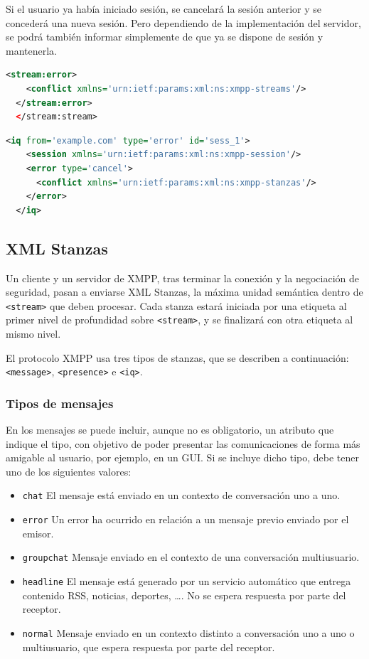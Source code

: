 \documentclass[a4paper, 11pt]{article} %
\begin{document}
      Si el usuario ya había iniciado sesión, se cancelará la sesión anterior y se concederá
      una nueva sesión. Pero dependiendo de la implementación del servidor, se podrá también informar
      simplemente de que ya se dispone de sesión y mantenerla.
      
  \begin{lstlisting}[language=XML]
  <stream:error>
    <conflict xmlns='urn:ietf:params:xml:ns:xmpp-streams'/>
  </stream:error>
  </stream:stream>
  \end{lstlisting}
  \begin{lstlisting}[language=XML]
  <iq from='example.com' type='error' id='sess_1'>
    <session xmlns='urn:ietf:params:xml:ns:xmpp-session'/>
    <error type='cancel'>
      <conflict xmlns='urn:ietf:params:xml:ns:xmpp-stanzas'/>
    </error>
  </iq>
  \end{lstlisting}  

  \subsection{XML Stanzas}
    Un cliente y un servidor de XMPP, tras terminar la conexión y la negociación de seguridad,
    pasan a enviarse XML Stanzas, la máxima unidad semántica dentro de \texttt{<stream>} que deben procesar.
    Cada stanza estará iniciada por una etiqueta al primer nivel de profundidad sobre \texttt{<stream>},
    y se finalizará con otra etiqueta al mismo nivel.
    
    El protocolo XMPP usa tres tipos de stanzas, que se describen a continuación: \texttt{<message>}, \texttt{<presence>}
    e \texttt{<iq>}.
  
    \subsubsection{Tipos de mensajes}
      En los mensajes se puede incluir, aunque no es obligatorio, un atributo que indique el tipo, con objetivo de poder
      presentar las comunicaciones de forma más amigable al usuario, por ejemplo, en un GUI. Si se incluye dicho tipo, debe
      tener uno de los siguientes valores:
      
      \begin{itemize}
	\item \texttt{chat} El mensaje está enviado en un contexto de conversación uno a uno.
	\item \texttt{error} Un error ha ocurrido en relación a un mensaje previo enviado por el emisor.
	\item \texttt{groupchat} Mensaje enviado en el contexto de una conversación multiusuario.
	\item \texttt{headline} El mensaje está generado por un servicio automático que entrega contenido RSS, noticias, 
	  deportes, \ldots. No se espera respuesta por parte del receptor.
	\item \texttt{normal} Mensaje enviado en un contexto distinto a conversación uno a uno o multiusuario, que espera
	  respuesta por parte del receptor.
      \end{itemize}
      
\end{document}
